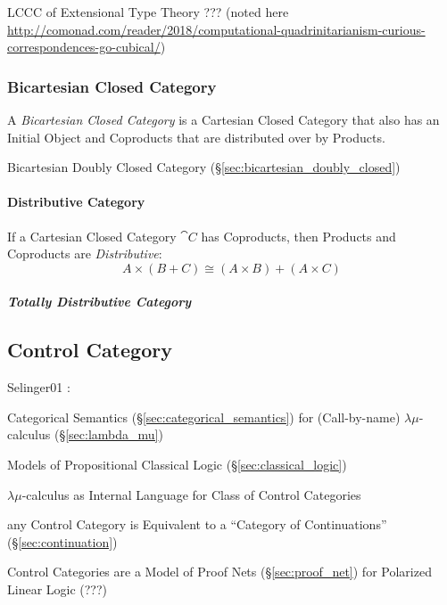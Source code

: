 LCCC of Extensional Type Theory ??? (noted here
\url{http://comonad.com/reader/2018/computational-quadrinitarianism-curious-correspondences-go-cubical/})



\subsubsection{Bicartesian Closed Category}\label{sec:bicartesian}

A \emph{Bicartesian Closed Category} is a Cartesian Closed Category
that also has an Initial Object and Coproducts that are distributed
over by Products.

\fist Bicartesian Doubly Closed Category
(\S\ref{sec:bicartesian_doubly_closed})



\paragraph{Distributive Category}\label{sec:distributive_category}\hfill

If a Cartesian Closed Category $\cat{C}$ has Coproducts, then
Products and Coproducts are \emph{Distributive}:\cite{awodey06}
\[
  A \times (B + C) \cong (A \times B) + (A \times C)
\]



\subparagraph{Totally Distributive Category}\hfill
\label{sec:totally_distributive_category}



\subsection{Control Category}\label{sec:control_category}

Selinger01 \cite{selinger01}:

Categorical Semantics (\S\ref{sec:categorical_semantics}) for
(Call-by-name) $\lambda\mu$-calculus (\S\ref{sec:lambda_mu})

Models of Propositional Classical Logic (\S\ref{sec:classical_logic})

$\lambda\mu$-calculus as Internal Language for Class of Control
Categories

any Control Category is Equivalent to a ``Category of Continuations''
(\S\ref{sec:continuation})

Control Categories are a Model of Proof Nets (\S\ref{sec:proof_net})
for Polarized Linear Logic (???) %


